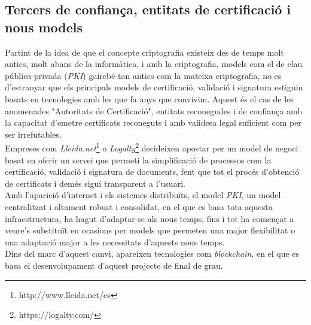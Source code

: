 \subsection{Tercers de confiança, entitats de certificació i nous models}
\label{estatArt:thirdparty}
Partint de la idea de que el concepte criptografia existeix des de temps molt antics, molt abans de la informàtica, i amb la criptografia, models com el de clau pública-privada (\textit{PKI}) gairebé tan antics com la mateixa criptografia, no es d'estranyar que els principals models de certificació, validació i  signatura estiguin basats en tecnologies amb les que fa anys que convivim. Aquest és el cas de les anomenades "Autoritats de Certificació", entitats reconegudes i de confiança amb la capacitat d'emetre certificats reconeguts i amb validesa legal suficient com per ser irrefutables.\\
\newline Empreses com \textit{Lleida.net}\footnote{http://www.lleida.net/es} o \textit{Logalty}\footnote{https://logalty.com/} decideixen apostar per un model de negoci basat en oferir un servei que permeti la simplificació de processos com la certificació, validació i signatura de documents, fent que tot el procés d'obtenció de certificats i demés sigui transparent a l'usuari.\\
\newline Amb l'aparició d'internet i els sistemes distribuïts, el model \textit{PKI}, un model centralitzat i altament robust i consolidat, en el que es basa tota aquesta infraestructura, ha hagut d'adaptar-se als nous temps, fins i tot ha començat a veure's substituït en ocasions per models que permeten una major flexibilitat o una adaptació major a les necessitats d'aquests nous temps.\\
\newline Dins del marc d'aquest canvi, apareixen tecnologies com \textit{blockchain}, en el que es basa el desenvolupament d'aquest projecte de final de grau.